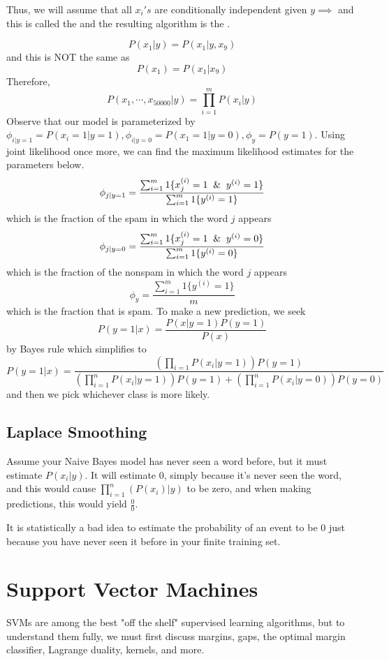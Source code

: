 \documentclass[12pt]{scrartcl}
\begin{document}
Thus, we will assume that all $x_i's$ are conditionally independent given $y \implies$ and this is called the  and the resulting algorithm is the .

\[P(x_1 | y) = P(x_1 | y, x_9)\] and this is NOT the same as 
\[P(x_1) = P(x_1 | x_9)\]
Therefore, 
\[P(x_1, \cdots, x_{50000} | y) = \prod_{i=1}^m P(x_i | y)\]
Observe that our model is parameterized by $\phi_{i | y = 1} = P(x_i = 1 | y = 1), \phi_{i | y = 0} = P(x_1 = 1 | y = 0), \phi_y = P(y = 1)$. Using joint likelihood once more, we can find the maximum likelihood estimates for the parameters below.
\[\phi_{j | y = 1} = \frac{\sum_{i=1}^m 1\{x_j^{(i)} = 1 \And y^{(i)} = 1\}}{\sum_{i=1}^m 1\{y^{(i)} = 1\}}\]
which is the fraction of the spam in which the word $j$ appears
\[\phi_{j | y = 0} = \frac{\sum_{i=1}^m 1\{x_j^{(i)} = 1 \And y^{(i)} = 0\}}{\sum_{i=1}^m 1\{y^{(i)} = 0\}}\]
which is the fraction of the nonspam in which the word $j$ appears
\[\phi_{y} = \frac{\sum_{i=1}^m 1\{y^{(i)} = 1\}}{m}\]
which is the fraction that is spam.
To make a new prediction, we seek \[P(y = 1 | x) = \frac{P(x| y = 1)P(y = 1)}{P(x)}\]
by Bayes rule which simplifies to 
\[P(y = 1 | x) = \frac{(\prod_{i=1}P(x_i | y = 1))P(y = 1)}{(\prod_{i=1}^nP(x_i | y = 1))P(y = 1) + (\prod_{i=1}^nP(x_i | y = 0))P(y=0)}\]
and then we pick whichever class is more likely.

\subsection{Laplace Smoothing}

Assume your Naive Bayes model has never seen a word before, but it must estimate $P(x_i | y)$. It will estimate 0, simply because it's never seen the word, and this would cause $\prod_{i=1}^n (P(x_i) | y)$ to be zero, and when making predictions, this would yield $\frac{0}{0}$.

\begin{note}
    It is statistically a bad idea to estimate the probability of an event to be 0 just because you have never seen it before in your finite training set. 
\end{note}

\section{Support Vector Machines}

SVMs are among the best "off the shelf" supervised learning algorithms, but to understand them fully, we must first discuss margins, gaps, the optimal margin classifier, Lagrange duality, kernels, and more.
\end{document}
